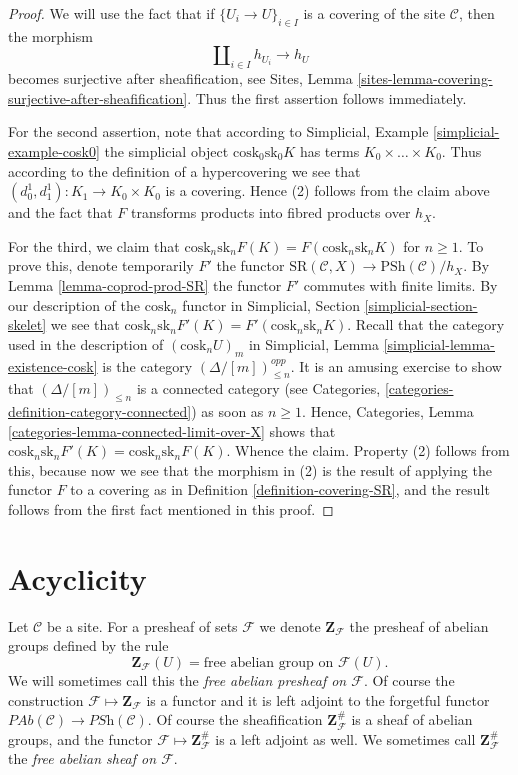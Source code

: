 \begin{proof}
We will use the fact that if
$\{U_i \to U\}_{i \in I}$ is a covering of the site
$\mathcal{C}$, then the morphism
$$
\amalg_{i \in I} h_{U_i} \to h_U
$$
becomes surjective after sheafification, see
Sites, Lemma \ref{sites-lemma-covering-surjective-after-sheafification}.
Thus the first assertion follows immediately.

\medskip\noindent
For the second assertion, note that according to
Simplicial, Example \ref{simplicial-example-cosk0}
the simplicial object $\text{cosk}_0 \text{sk}_0 K$
has terms $K_0 \times \ldots \times K_0$. Thus
according to the definition of a hypercovering we
see that $(d^1_0, d^1_1) : K_1 \to K_0 \times K_0$ is a
covering. Hence (2) follows from the claim above
and the fact that $F$ transforms products into fibred
products over $h_X$.

\medskip\noindent
For the third, we claim that
$\text{cosk}_n \text{sk}_n F(K) =
F(\text{cosk}_n \text{sk}_n K)$ for $n \geq 1$.
To prove this, denote temporarily $F'$ the functor
$\text{SR}(\mathcal{C}, X) \to \text{PSh}(\mathcal{C})/h_X$.
By Lemma \ref{lemma-coprod-prod-SR} the functor
$F'$ commutes with finite limits.
By our description of the $\text{cosk}_n$ functor in
Simplicial, Section \ref{simplicial-section-skelet}
we see that $\text{cosk}_n \text{sk}_n F'(K) =
F'(\text{cosk}_n \text{sk}_n K)$.
Recall that the category used in the description of
$(\text{cosk}_n U)_m$ in
Simplicial, Lemma \ref{simplicial-lemma-existence-cosk}
is the category $(\Delta/[m])^{opp}_{\leq n}$. It is an
amusing exercise to show that $(\Delta/[m])_{\leq n}$ is
a connected category (see
Categories, \ref{categories-definition-category-connected})
as soon as $n \geq 1$. Hence,
Categories, Lemma \ref{categories-lemma-connected-limit-over-X}
shows that $\text{cosk}_n \text{sk}_n F'(K) =
\text{cosk}_n \text{sk}_n F(K)$. Whence the claim.
Property (2) follows from this, because now we see that
the morphism in (2) is the result of applying the
functor $F$ to a covering as in Definition \ref{definition-covering-SR},
and the result follows from the first fact mentioned
in this proof.
\end{proof}



\section{Acyclicity}
\label{section-acyclicity}

\noindent
Let $\mathcal{C}$ be a site.
For a presheaf of sets $\mathcal{F}$ we denote $\mathbf{Z}_\mathcal{F}$
the presheaf of abelian groups defined by the rule
$$
\mathbf{Z}_\mathcal{F}(U) = \text{free abelian group on }\mathcal{F}(U).
$$
We will sometimes call this the {\it free abelian presheaf on $\mathcal{F}$}.
Of course the construction $\mathcal{F} \mapsto \mathbf{Z}_\mathcal{F}$
is a functor and it is left adjoint to the forgetful functor
$\textit{PAb}(\mathcal{C}) \to \textit{PSh}(\mathcal{C})$.
Of course the sheafification $\mathbf{Z}_\mathcal{F}^\#$ is
a sheaf of abelian groups, and the functor
$\mathcal{F} \mapsto \mathbf{Z}_\mathcal{F}^\#$ is a
left adjoint as well. We sometimes call $\mathbf{Z}_\mathcal{F}^\#$
the {\it free abelian sheaf on $\mathcal{F}$}.

